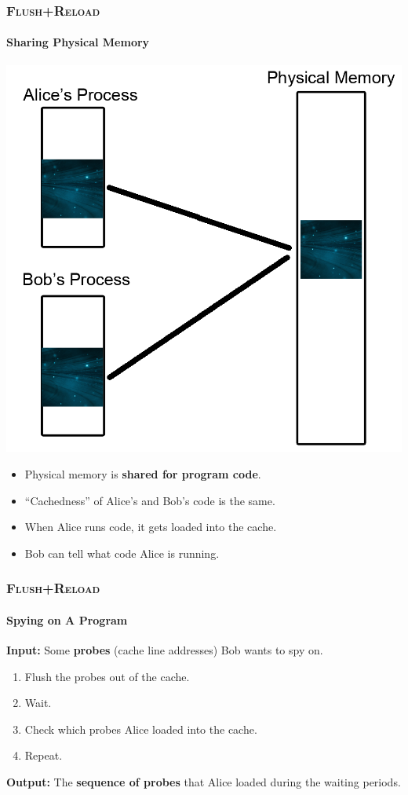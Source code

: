 \documentclass{beamer}
\begin{document}
\begin{frame}
    \frametitle{\textsc{Flush+Reload}}
    \framesubtitle{Sharing Physical Memory}

    \begin{center}
        \includegraphics{codesharing.png}
    \end{center}

    \begin{itemize}
        \item Physical memory is \textbf{shared for program code}.
        \item ``Cachedness'' of Alice's and Bob's code is the same.
        \item When Alice runs code, it gets loaded into the cache.
        \item Bob can tell what code Alice is running.
    \end{itemize}
\end{frame}

\begin{frame}
    \frametitle{\textsc{Flush+Reload}}
    \framesubtitle{Spying on A Program}

    \textbf{Input:} Some \textbf{probes} (cache line addresses) Bob wants to spy
    on.
    
    \begin{enumerate}
        \item Flush the probes out of the cache.
        \item Wait.
        \item Check which probes Alice loaded into the cache.
        \item Repeat.
    \end{enumerate}

    \textbf{Output:} The \textbf{sequence of probes} that Alice loaded during
    the waiting periods.
\end{frame}
\end{document}
